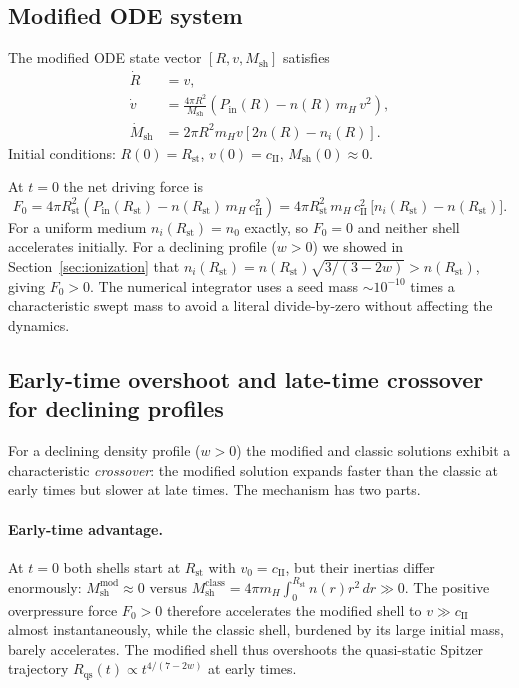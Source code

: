 \documentclass[12pt]{article}
\begin{document}
\subsection{Modified ODE system}

The modified ODE state vector $[R, v, M_\mathrm{sh}]$ satisfies
\begin{align}
  \label{eq:ode_mod}
  \dot{R} &= v, \\
  \dot{v} &= \frac{4\pi R^2}{M_\mathrm{sh}}\!\left(P_\mathrm{in}(R)
              - n(R)\,m_H\,v^2\right), \\
  \dot{M}_\mathrm{sh} &= 2\pi R^2 m_H v\!\left[2n(R) - n_i(R)\right].
\end{align}
Initial conditions: $R(0)=R_\mathrm{st}$, $v(0)=c_\mathrm{II}$,
$M_\mathrm{sh}(0)\approx 0$.

At $t=0$ the net driving force is
\begin{equation}
  F_0 = 4\pi R_\mathrm{st}^2\!\left(P_\mathrm{in}(R_\mathrm{st})
        - n(R_\mathrm{st})\,m_H\,c_\mathrm{II}^2\right)
      = 4\pi R_\mathrm{st}^2\,m_H\,c_\mathrm{II}^2\,
        \bigl[n_i(R_\mathrm{st}) - n(R_\mathrm{st})\bigr].
\end{equation}
For a uniform medium $n_i(R_\mathrm{st})=n_0$ exactly, so $F_0=0$ and
neither shell accelerates initially.
For a declining profile ($w>0$) we showed in
Section~\ref{sec:ionization} that
$n_i(R_\mathrm{st}) = n(R_\mathrm{st})\sqrt{3/(3-2w)} > n(R_\mathrm{st})$,
giving $F_0 > 0$.  The numerical integrator uses a seed mass
$\sim 10^{-10}$ times a characteristic swept mass to avoid a literal
divide-by-zero without affecting the dynamics.

\subsection{Early-time overshoot and late-time crossover for declining profiles}
\label{sec:crossover}

For a declining density profile ($w>0$) the modified and classic solutions
exhibit a characteristic \emph{crossover}: the modified solution expands
faster than the classic at early times but slower at late times.
The mechanism has two parts.

\paragraph{Early-time advantage.}
At $t=0$ both shells start at $R_\mathrm{st}$ with $v_0=c_\mathrm{II}$, but
their inertias differ enormously: $M_\mathrm{sh}^\mathrm{mod}\approx 0$
versus $M_\mathrm{sh}^\mathrm{class} = 4\pi m_H\!\int_0^{R_\mathrm{st}}
n(r)r^2\,dr \gg 0$.  The positive overpressure force $F_0 > 0$ therefore
accelerates the modified shell to $v \gg c_\mathrm{II}$ almost
instantaneously, while the classic shell, burdened by its large initial mass,
barely accelerates.  The modified shell thus overshoots the quasi-static
Spitzer trajectory $R_\mathrm{qs}(t) \propto t^{4/(7-2w)}$ at early times.
\end{document}
